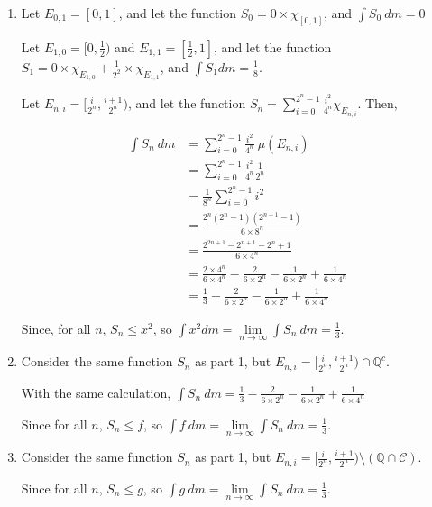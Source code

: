 \documentclass[12pt]{article}
\begin{document}
\begin{enumerate}
\item Let $E_{0,1} = [0,1]$, and let the function $S_0 = 0 \times \chi_{[0,1]}$, and $\int S_0 ~dm = 0$

      Let $E_{1,0} = [0, \frac{1}{2})$ and $E_{1,1} = [\frac{1}{2}, 1]$, and let the function $S_1 = 0 \times \chi_{E_{1,0}} + \frac{1}{2^2} \times \chi_{E_{1,1}}$, and $\int S_1 dm = \frac{1}{8}$.

      Let $E_{n,i} = [\frac{i}{2^n}, \frac{i+1}{2^n})$, and let the function $S_n = \sum\limits^{2^n-1}_{i=0} \frac{i^2}{4^n} \chi_{E_{n,i}}$. Then, 

      \begin{align*}
      \int S_n~dm &= \sum\limits^{2^n-1}_{i=0} \frac{i^2}{4^n} ~ \mu(E_{n,i})\\
      &= \sum\limits^{2^n-1}_{i=0} \frac{i^2}{4^n} \frac{1}{2^n}\\
      &= \frac{1}{8^n} \sum\limits^{2^n-1}_{i=0} i^2\\
      &= \frac{2^n(2^n-1)(2^{n+1}-1)}{6\times8^n}\\
      &= \frac{2^{2n+1} -2^{n+1} - 2^n +1}{6\times4^n}\\
      &= \frac{2\times4^n}{6\times4^n} - \frac{2}{6\times2^n} - \frac{1}{6\times2^n} + \frac{1}{6\times 4^n}\\
      &= \frac{1}{3} - \frac{2}{6\times2^n} - \frac{1}{6\times2^n} + \frac{1}{6\times 4^n}
      \end{align*}

      Since, for all $n$, $S_n \le x^2$, so $\int x^2dm = \lim\limits_{n \to \infty} \int S_n~dm = \frac{1}{3}$.

\item Consider the same function $S_n$ as part 1, but $E_{n,i} = [\frac{i}{2^n}, \frac{i+1}{2^n}) \cap \mathbb{Q}^c$.

        With the same calculation, $\int S_n ~dm = \frac{1}{3} - \frac{2}{6\times2^n} - \frac{1}{6\times2^n} + \frac{1}{6\times 4^n}$

        Since for all $n$, $S_n \le f$, so $\int f~dm = \lim\limits_{n \to \infty} \int S_n~dm = \frac{1}{3}$.

\item Consider the same function $S_n$ as part 1, but $E_{n,i} = [\frac{i}{2^n}, \frac{i+1}{2^n}) \setminus (\mathbb{Q}\cap\mathscr{C})$.

        Since for all $n$, $S_n \le g$, so $\int g~dm = \lim\limits_{n \to \infty} \int S_n~dm = \frac{1}{3}$.

\end{enumerate}
\end{document}
